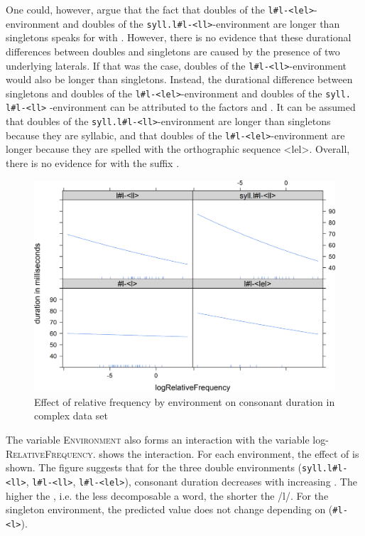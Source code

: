 One could, however, argue that the fact that doubles of the \texttt{l\#l-<lel>}- environment and doubles of the \texttt{syll.l\#l-<ll>}-environment are  longer than singletons speaks for  with . However, there is no evidence that these durational differences between doubles and singletons are caused by the presence of two underlying laterals. If that was the case, doubles of the \texttt{l\#l-<ll>}-environment would also be longer than singletons. 
Instead, the durational difference between singletons and doubles of the \texttt{l\#l-<lel>}-environment and doubles of the \texttt{syll. l\#l-<ll>} -environment can be attributed to the factors  and . It can be assumed that doubles of the  \texttt{syll.l\#l-<ll>}-environment are longer than singletons because they are syllabic, and that doubles of the  \texttt{l\#l-<lel>}-environment are longer because they are spelled with the orthographic sequence <lel>. 
 Overall, there is no evidence for  with the suffix .


\begin{figure}
	
	\includegraphics [scale=0.5] {images/Experiment/LyModelInterRelFreqEnv}
	\caption{Effect of relative frequency by environment on consonant duration in complex data set}
	\label{fig:Rel Env lyComplex experiment}
	
\end{figure}



The variable \textsc{Environment} also forms an interaction with the variable log- \textsc{RelativeFrequency}.  shows the interaction. For each environment, the effect of  is shown. 
The figure suggests that for the three double environments (\texttt{syll.l\#l- <ll>}, \texttt{l\#l-<ll>}, \texttt{l\#l-<lel>}), consonant duration decreases with increasing . The higher the , i.e. the less decomposable a word, the shorter the /l/. For the singleton environment, the predicted value does not change depending on  (\texttt{\#l-<l>}).




